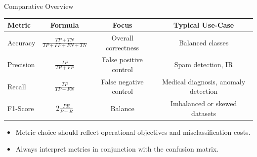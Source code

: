 \documentclass[serif, aspectratio=169]{beamer}
\begin{document}
    \begin{frame}{Comparative Overview}
        \begin{center}
            \begin{tabular}{lccc}
                \toprule
                Metric & Formula & Focus & Typical Use-Case \\
                \midrule
                Accuracy & $\frac{TP+TN}{TP+FP+FN+TN}$ & Overall correctness & Balanced classes \\
                Precision & $\frac{TP}{TP+FP}$ & False positive control & Spam detection, IR \\
                Recall & $\frac{TP}{TP+FN}$ & False negative control & Medical diagnosis, anomaly detection \\
                F1-Score & $2\frac{PR}{P+R}$ & Balance & Imbalanced or skewed datasets \\
                \bottomrule
            \end{tabular}
        \end{center}
        \vspace{0.3cm}
        \begin{itemize}
            \item Metric choice should reflect operational objectives and misclassification costs.
            \item Always interpret metrics in conjunction with the confusion matrix.
        \end{itemize}
    \end{frame}




\end{document}
